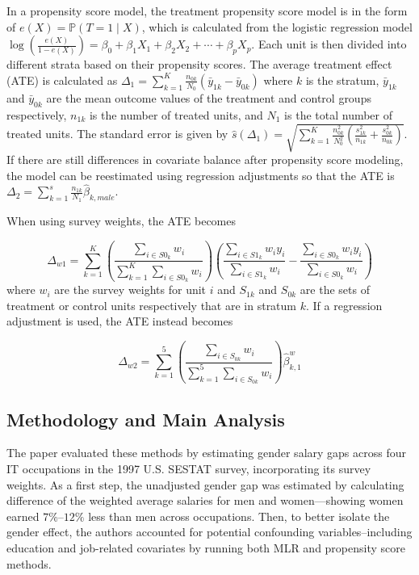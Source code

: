 \documentclass[12pt]{article}
\begin{document}
In a propensity score model, the treatment propensity score model is in the form of $e(X) = \mathbb{P}(T = 1 \mid X)$, which is calculated from the logistic regression model $\log\left( \frac{e(X)}{1 - e(X)} \right) = \beta_0 + \beta_1 X_1 + \beta_2 X_2 + \cdots + \beta_p X_p$. Each unit is then divided into different strata based on their propensity scores. The average treatment effect (ATE) is calculated as $ \Delta_1 = \sum_{k=1}^K \frac{n_{0k}}{N_0}(\bar{y}_{1k} - \bar{y}_{0k})$ where $k$ is the stratum, $\bar{y}_{1k}$ and $\bar{y}_{0k}$ are the mean outcome values of the treatment and control groups respectively, $n_{1k}$ is the number of treated units, and $N_1$ is the total number of treated units. The standard error is given by $\hat{s}(\Delta_1) = \sqrt{\sum_{k=1}^K \frac{n_{0k}^2}{N_0^2} (\frac{s^2_{1k}}{n_{1k}} + \frac{s^2_{0k}}{n_{0k}})}$. If there are still differences in covariate balance after propensity score modeling, the model can be reestimated using regression adjustments so that the ATE is $\Delta_2 = \sum_{k=1}^s \frac{n_{1k}}{N_1} \hat{\beta}_{k,male}$.

When using survey weights, the ATE becomes

\begin{equation}
\Delta_{w1} = \sum_{k=1}^{K} \left( 
\frac{\sum_{i \in S0_k} w_i}{\sum_{k=1}^{K} \sum_{i \in S0_k} w_i} 
\right) \left( 
\frac{\sum_{i \in S1_k} w_i y_i}{\sum_{i \in S1_k} w_i} - 
\frac{\sum_{i \in S0_k} w_i y_i}{\sum_{i \in S0_k} w_i} 
\right) 
\label{eq:ate_weights}
\end{equation}
where $w_i$ are the survey weights for unit $i$ and $S_{1k}$ and $S_{0k}$ are the sets of treatment or control units respectively that are in stratum $k$. If a regression adjustment is used, the ATE instead becomes 

\begin{equation}
\Delta_{w2} = \sum_{k=1}^{5} 
\left( 
\frac{\sum_{i \in S_{0k}} w_i}{\sum_{k=1}^{5} \sum_{i \in S_{0k}} w_i} 
\right) 
\hat{\beta}^{w}_{k,1}
\label{eq:ate_regadj}
\end{equation}



\subsection{Methodology and Main Analysis} \label{subsec:meth_analysis}

The paper evaluated these methods by estimating gender salary gaps across four IT occupations in the 1997 U.S. SESTAT survey, incorporating its survey weights. As a first step, the unadjusted gender gap was estimated by calculating difference of the weighted average salaries for men and women—showing women earned $7\%\text{--}12\%$ less than men across occupations. Then, to better isolate the gender effect, the authors accounted for potential confounding variables--including education and job-related covariates by running both MLR and propensity score methods.
\end{document}
